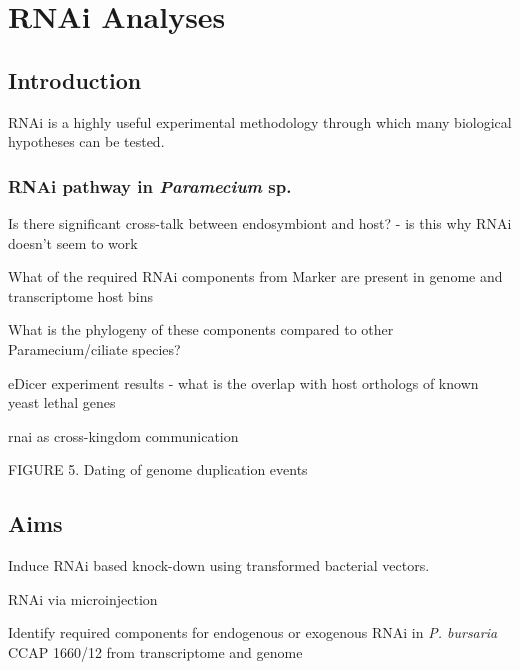 \graphicspath{{chapters/6.Chapter_4/figures/}}

\chapter{RNAi Analyses}


\section{Introduction}

RNAi is a highly useful experimental methodology through which
many biological hypotheses can be tested.





\subsection{RNAi pathway in \textit{Paramecium} sp.}

Is there significant cross-talk between endosymbiont and host? - is this why RNAi doesn't seem to work

What of the required RNAi components from Marker are present in genome and transcriptome host bins

What is the phylogeny of these components compared to other Paramecium/ciliate species?

eDicer experiment results - what is the overlap with host orthologs of known yeast lethal genes

rnai as cross-kingdom communication \citep{Weiberg2015}

FIGURE 5. Dating of genome duplication events







\section{Aims}

Induce RNAi based knock-down using transformed bacterial vectors.

RNAi via microinjection

Identify required components for endogenous or exogenous RNAi in \textit{P. bursaria} CCAP 1660/12 from transcriptome and genome

